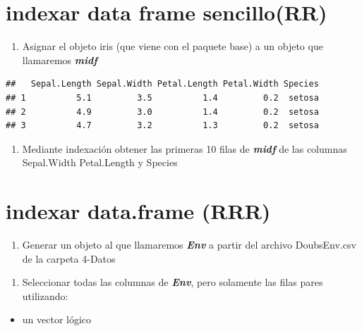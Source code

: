\documentclass[]{book}
\providecommand{\tightlist}{%
  \setlength{\itemsep}{0pt}\setlength{\parskip}{0pt}}
\begin{document}
\hypertarget{indexar-data-frame-sencillorr}{%
\section{indexar data frame sencillo(RR)}\label{indexar-data-frame-sencillorr}}

\begin{enumerate}
\def\labelenumi{\arabic{enumi}.}
\tightlist
\item
  Asignar el objeto iris (que viene con el paquete base) a un objeto que llamaremos \textbf{\emph{midf}}
\end{enumerate}

\begin{verbatim}
##   Sepal.Length Sepal.Width Petal.Length Petal.Width Species
## 1          5.1         3.5          1.4         0.2  setosa
## 2          4.9         3.0          1.4         0.2  setosa
## 3          4.7         3.2          1.3         0.2  setosa
\end{verbatim}

\begin{enumerate}
\def\labelenumi{\arabic{enumi}.}
\setcounter{enumi}{1}
\tightlist
\item
  Mediante indexación obtener las primeras 10 filas de \textbf{\emph{midf}} de las columnas Sepal.Width Petal.Length y Species
\end{enumerate}

\hypertarget{indexar-data.frame-rrr}{%
\section{indexar data.frame (RRR)}\label{indexar-data.frame-rrr}}

\begin{enumerate}
\def\labelenumi{\arabic{enumi}.}
\tightlist
\item
  Generar un objeto al que llamaremos \textbf{\emph{Env}} a partir del archivo DoubsEnv.csv de la carpeta 4-Datos
\end{enumerate}

\begin{enumerate}
\def\labelenumi{\arabic{enumi}.}
\setcounter{enumi}{1}
\tightlist
\item
  Seleccionar todas las columnas de \textbf{\emph{Env}}, pero solamente las filas pares utilizando:
\end{enumerate}

\begin{itemize}
\tightlist
\item
  un vector lógico
\end{itemize}
\end{document}
